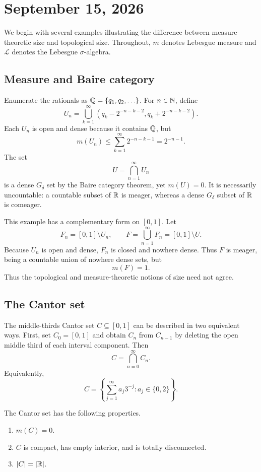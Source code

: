 \section{September 15, 2026}

We begin with several examples illustrating the difference between
measure-theoretic size and topological size. Throughout, $m$ denotes
Lebesgue measure and $\mathcal L$ denotes the Lebesgue $\sigma$-algebra.

\subsection{Measure and Baire category}

Enumerate the rationals as $\mathbb{Q}=\{q_1,q_2,\ldots\}$. For
$n\in\mathbb{N}$, define
\[
  U_n=\bigcup_{k=1}^{\infty}
  \left(q_k-2^{-n-k-2},q_k+2^{-n-k-2}\right).
\]
Each $U_n$ is open and dense because it contains $\mathbb{Q}$, but
\[
  m(U_n)
  \leq\sum_{k=1}^{\infty}2^{-n-k-1}
  =2^{-n-1}.
\]
The set
\[
  U=\bigcap_{n=1}^{\infty}U_n
\]
is a dense $G_\delta$ set by the Baire category theorem, yet
$m(U)=0$. It is necessarily uncountable: a countable subset of
$\mathbb{R}$ is meager, whereas a dense $G_\delta$ subset of $\mathbb{R}$ is
comeager.

This example has a complementary form on $[0,1]$. Let
\[
  F_n=[0,1]\setminus U_n,
  \qquad
  F=\bigcup_{n=1}^{\infty}F_n=[0,1]\setminus U.
\]
Because $U_n$ is open and dense, $F_n$ is closed and nowhere dense.
Thus $F$ is meager, being a countable union of nowhere dense sets, but
\[
  m(F)=1.
\]
Thus the topological and measure-theoretic notions of size need not agree.

\subsection{The Cantor set}

The middle-thirds Cantor set $C\subseteq[0,1]$ can be described in two
equivalent ways. First, set $C_0=[0,1]$ and obtain $C_n$ from
$C_{n-1}$ by deleting the open middle third of each interval component.
Then
\[
  C=\bigcap_{n=0}^{\infty}C_n.
\]
Equivalently,
\[
  C=\left\{
    \sum_{j=1}^{\infty}a_j3^{-j}:a_j\in\{0,2\}
  \right\}.
\]

\begin{proposition}\label{prop:cantor-set-properties-sep-15}
  The Cantor set has the following properties.
  \begin{enumerate}[label=(\alph*)]
    \item $m(C)=0$.
    \item $C$ is compact, has empty interior, and is totally
      disconnected.
    \item $|C|=|\mathbb{R}|$.
  \end{enumerate}
\end{proposition}

